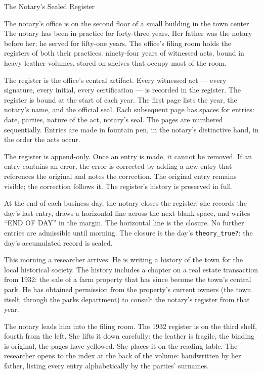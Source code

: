 \begin{coda}{The Notary's Sealed Register}

The notary's office is on the second floor of a small building in the
town center. The notary has been in practice for forty-three years.
Her father was the notary before her; he served for fifty-one years.
The office's filing room holds the registers of both their practices:
ninety-four years of witnessed acts, bound in heavy leather volumes,
stored on shelves that occupy most of the room.

The register is the office's central artifact. Every witnessed act
--- every signature, every initial, every certification --- is
recorded in the register. The register is bound at the start of each
year. The first page lists the year, the notary's name, and the
official seal. Each subsequent page has spaces for entries: date,
parties, nature of the act, notary's seal. The pages are numbered
sequentially. Entries are made in fountain pen, in the notary's
distinctive hand, in the order the acts occur.

The register is append-only. Once an entry is made, it cannot be
removed. If an entry contains an error, the error is corrected by
adding a new entry that references the original and notes the
correction. The original entry remains visible; the correction
follows it. The register's history is preserved in full.

At the end of each business day, the notary closes the register: she
records the day's last entry, draws a horizontal line across the
next blank space, and writes ``END OF DAY'' in the margin. The
horizontal line is the closure. No further entries are admissible
until morning. The closure is the day's \texttt{theory\_true?}: the
day's accumulated record is sealed.

This morning a researcher arrives. He is writing a history of the
town for the local historical society. The history includes a chapter
on a real estate transaction from 1932: the sale of a farm property
that has since become the town's central park. He has obtained
permission from the property's current owners (the town itself,
through the parks department) to consult the notary's register from
that year.

The notary leads him into the filing room. The 1932 register is on
the third shelf, fourth from the left. She lifts it down carefully:
the leather is fragile, the binding is original, the pages have
yellowed. She places it on the reading table. The researcher opens
to the index at the back of the volume: handwritten by her father,
listing every entry alphabetically by the parties' surnames.


\end{coda}
